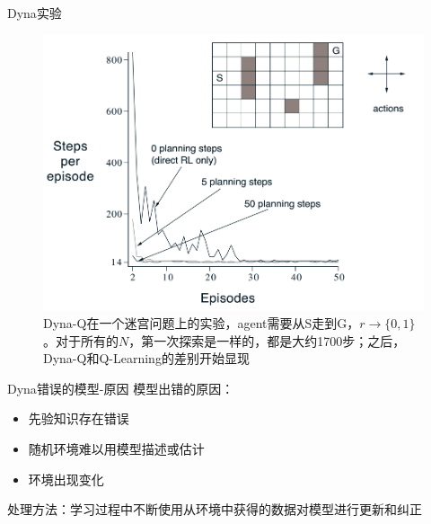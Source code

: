 \documentclass[10pt]{beamer}
\begin{document}
	\begin{frame}{Dyna}{实验}
		\begin{figure}
			\centering
			\includegraphics[width=0.7\linewidth]{pictures/dyna-exp}
			\caption[Dnya-Q 迷宫]{Dyna-Q在一个迷宫问题上的实验，agent需要从S走到G，$r\rightarrow \{0,1\}$。对于所有的$N$，第一次探索是一样的，都是大约1700步；之后，Dyna-Q和Q-Learning的差别开始显现}
			\label{fig:dyna-exp}
		\end{figure}
	\end{frame}

	\begin{frame}{Dyna}{错误的模型-原因}
		模型出错的原因：
		\begin{itemize}
			\item 先验知识存在错误
			\item 随机环境难以用模型描述或估计
			\item 环境出现变化
		\end{itemize}
		
		处理方法：学习过程中不断使用从环境中获得的数据对模型进行更新和纠正
	\end{frame}
	
\end{document}
